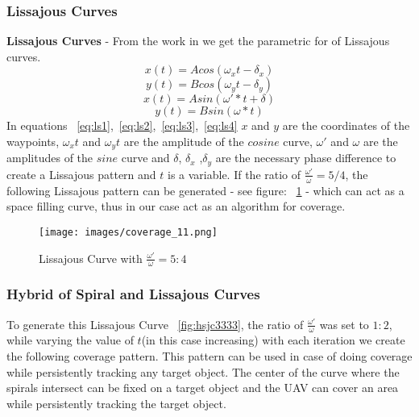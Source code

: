 \subsubsection{Lissajous Curves}
\textbf{Lissajous Curves} - From the work in \cite{14} we get the parametric for of Lissajous curves. \\
\begin{equation}
\label{eq:ls1}
x(t) = Acos(\omega_xt-\delta_x)
\end{equation}
\begin{equation}
\label{eq:ls2}
y(t) = Bcos(\omega_yt-\delta_y)
\end{equation}
\begin{equation}
\label{eq:ls3}
x(t) = Asin(\omega'*t+\delta)
\end{equation}
\begin{equation}
\label{eq:ls4}
y(t) = Bsin(\omega*t)
\end{equation}
In equations ~\ref{eq:ls1},~\ref{eq:ls2},~\ref{eq:ls3},~\ref{eq:ls4} $x$ and $y$ are the coordinates of the waypoints, $\omega_xt$ and $\omega_yt$ are the amplitude of the $cosine$ curve, $\omega'$ and $\omega$ are the amplitudes of the $sine$ curve and $\delta$, $\delta_x$ ,$\delta_y$ are the necessary phase difference to create a Lissajous pattern and $t$ is a variable. 
If the ratio of $\frac{\omega'}{\omega} = 5/4$, the following Lissajous pattern can be generated - see figure: ~\ref{fig:ljc221} -  which can act as a space filling curve, thus in our case act as an algorithm for coverage.

\begin{figure}[htbp] %
 \centering
   \texttt{[image: images/coverage\_11.png]}
   \caption[Lissajous Curve \cite{14}]
   {Lissajous Curve with $\frac{\omega'}{\omega} = 5:4$  \cite{14}}
   
\label{fig:ljc221}
\end{figure}

\subsubsection{Hybrid of Spiral and Lissajous Curves}
To generate this Lissajous Curve ~\ref{fig:hsjc3333}, the ratio of $\frac{\omega'}{\omega}$ was set to $1:2$, while varying the value of $t$(in this case increasing) with each iteration we create the following coverage pattern. This pattern can be used in case of doing coverage while persistently tracking any target object. The center of the curve where the spirals intersect can be fixed on a target object and the UAV can cover an area while persistently tracking the target object.

